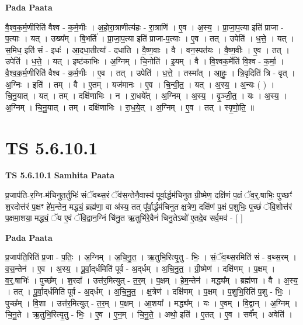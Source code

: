 \documentclass[17pt]{extarticle}
\begin{document}
\textbf{Pada Paata} \newline

वै॒श्व॒क॒र्म॒णीरिति॑ वैश्व - क॒र्म॒णीः । अ॒हो॒रा॒त्राणीत्य॑हः - रा॒त्राणि॑ । ए॒व । अ॒स्य॒ । प्रा॒जा॒प॒त्या इति॑ प्राजा - प॒त्याः । यत् । उख्य᳚म् । बि॒भर्ति॑ । प्रा॒जा॒प॒त्या इति॑ प्राजा-प॒त्याः । ए॒व । तत् । उपेति॑ । ध॒त्ते॒ । यत् । स॒मिध॒ इति॑ सं - इधः॑ । आ॒दधा॒तीत्या᳚ - दधा॑ति । वै॒ष्ण॒वाः । वै । वन॒स्पत॑यः । वै॒ष्ण॒वीः । ए॒व । तत् । उपेति॑ । ध॒त्ते॒ । यत् । इष्ट॑काभिः । अ॒ग्निम् । चि॒नोति॑ । इ॒यम् । वै । वि॒श्वक॒र्मेति॑ वि॒श्व - क॒र्मा॒ । वै॒श्व॒क॒र्म॒णीरिति॑ वैश्व - क॒र्म॒णीः । ए॒व । तत् । उपेति॑ । ध॒त्ते॒ । तस्मा᳚त् । आ॒हुः॒ । त्रि॒वृदिति॑ त्रि - वृत् । अ॒ग्निः । इति॑ । तम् । वै । ए॒तम् । यज॑मानः । ए॒व । चि॒न्वी॒त॒ । यत् । अ॒स्य॒ । अ॒न्यः ( ) । चि॒नु॒यात् । यत् । तम् । दक्षि॑णाभिः । न । रा॒धये᳚त् । अ॒ग्निम् । अ॒स्य॒ । वृ॒ञ्जी॒त॒ । यः । अ॒स्य॒ । अ॒ग्निम् । चि॒नु॒यात् । तम् । दक्षि॑णाभिः । रा॒ध॒ये॒त् । अ॒ग्निम् । ए॒व । तत् । स्पृ॒णो॒ति॒ ॥  \newline




\section*{ TS 5.6.10.1 }

\textbf{TS 5.6.10.1 } \newline
\textbf{Samhita Paata} \newline

प्र॒जाप॑ति-र॒ग्नि-म॑चिनुत॒र्तुभिः॑ संॅवथ्स॒रं ॅव॑स॒न्तेनै॒वास्य॑ पूर्वा॒र्द्धम॑चिनुत ग्री॒ष्मेण॒ दक्षि॑णं प॒क्षं ॅव॒र्॒.षाभिः॒ पुच्छꣳ॑ श॒रदोत्त॑रं प॒क्षꣳ हे॑म॒न्तेन॒ मद्ध्यं॒ ब्रह्म॑णा॒ वा अ॑स्य॒ तत् पू᳚र्वा॒र्द्धम॑चिनुत क्ष॒त्रेण॒ दक्षि॑णं प॒क्षं प॒शुभिः॒ पुच्छं॑ ॅवि॒शोत्त॑रं प॒क्षमा॒शया॒ मद्ध्यं॒ ॅय ए॒वं ॅवि॒द्वान॒ग्निं चि॑नु॒त ऋ॒तुभि॑रे॒वैनं॑ चिनु॒तेऽथो॑ ए॒तदे॒व सर्व॒मव॑ - [  ] \newline

\textbf{Pada Paata} \newline

प्र॒जाप॑ति॒रिति॑ प्र॒जा - प॒तिः॒ । अ॒ग्निम् । अ॒चि॒नु॒त॒ । ऋ॒तुभि॒रित्यृ॒तु - भिः॒ । सं॒ॅव॒थ्स॒रमिति॑ सं - व॒थ्स॒रम् । व॒स॒न्तेन॑ । ए॒व । अ॒स्य॒ । पू॒र्वा॒द्‌र्धमिति॑ पूर्व - अ॒द्‌र्धम् । अ॒चि॒नु॒त॒ । ग्री॒ष्मेण॑ । दक्षि॑णम् । प॒क्षम् । व॒र्॒.षाभिः॑ । पुच्छ᳚म् । श॒रदा᳚ । उत्त॑र॒मित्युत् - त॒र॒म् । प॒क्षम् । हे॒म॒न्तेन॑ । मद्ध्य᳚म् । ब्रह्म॑णा । वै । अ॒स्य॒ । तत् । पू॒र्वा॒द्‌र्धमिति॑ पूर्व - अ॒द्‌र्धम् । अ॒चि॒नु॒त॒ । क्ष॒त्रेण॑ । दक्षि॑णम् । प॒क्षम् । प॒शुभि॒रिति॑ प॒शु - भिः॒ । पुच्छ᳚म् । वि॒शा । उत्त॑र॒मित्युत् - त॒र॒म् । प॒क्षम् । आ॒शया᳚ । मद्ध्य᳚म् । यः । ए॒वम् । वि॒द्वान् । अ॒ग्निम् । चि॒नु॒ते । ऋ॒तुभि॒रित्यृ॒तु - भिः॒ । ए॒व । ए॒न॒म् । चि॒नु॒ते॒ । अथो॒ इति॑ । ए॒तत् । ए॒व । सर्व᳚म् । अवेति॑ ।  \newline
\end{document}
